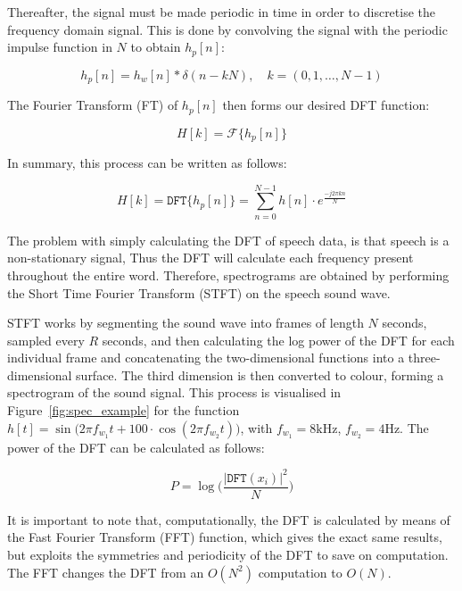 Thereafter, the signal must be made periodic in time in order to discretise the frequency domain signal. 
This is done by convolving the signal with the periodic impulse function in $N$ to obtain $h_{p}[n]$:

\begin{equation}
    h_{p}[n] = h_{w}[n] \ast \delta(n-kN), \quad k=(0,1,\dotsc,N-1)
\end{equation}

The Fourier Transform (FT) of $h_{p}[n]$ then forms our desired DFT function:

\begin{equation}
    H[k] = \mathcal{F} \{ h_{p}[n] \}
\end{equation}

In summary, this process can be written as follows:

\begin{equation}
    H[k] = \mathtt{DFT} \{ h_{p}[n] \} = \displaystyle\sum_{n=0}^{N-1} h[n] \cdot e^{\displaystyle\frac{-j2\pi kn}{N}}
\end{equation}

The problem with simply calculating the DFT of speech data, is that speech is a non-stationary signal, Thus the DFT will calculate each frequency present throughout the entire word. 
Therefore, spectrograms are obtained by performing the Short Time Fourier Transform (STFT) on the speech sound wave. 

STFT works by segmenting the sound wave into frames of length $N$ seconds, sampled every $R$ seconds, and then calculating the log power of the DFT for each individual frame and concatenating the two-dimensional functions into a three-dimensional surface. 
The third dimension is then converted to colour, forming a spectrogram of the sound signal. 
This process is visualised in Figure~\ref{fig:spec_example} for the function $h[t]=\sin\big(2\pi f_{w_1} t + 100 \cdot \cos(2\pi f_{w_2} t) \big)$, with $f_{w_1}= 8 \mathrm{kHz}$, $f_{w_2}= 4 \mathrm{Hz}$.
The power of the DFT can be calculated as follows:

\begin{equation}
    P = \log\bigg(\frac{|\mathtt{DFT}(x_i)|^2}{N}\bigg)
\end{equation}

It is important to note that, computationally, the DFT is calculated by means of the Fast Fourier Transform (FFT) function, which gives the exact same results, but exploits the symmetries and periodicity of the DFT to save on computation. 
The FFT changes the DFT from an $O(N^2)$ computation to $O(N)$.

